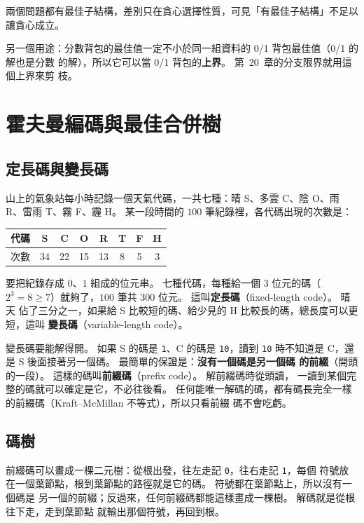兩個問題都有最佳子結構，差別只在貪心選擇性質，可見「有最佳子結構」不足以讓貪心成立。

另一個用途：分數背包的最佳值一定不小於同一組資料的 0/1 背包最佳值（0/1 的解也是分數
的解），所以它可以當 0/1 背包的\textbf{上界}。 第~20~章的分支限界就用這個上界來剪
枝。

\section{霍夫曼編碼與最佳合併樹}
\label{sec:gr-huffman}

\subsection{定長碼與變長碼}

山上的氣象站每小時記錄一個天氣代碼，一共七種：晴 S、多雲 C、陰 O、雨 R、雷雨 T、霧
F、霾 H。 某一段時間的 $100$ 筆紀錄裡，各代碼出現的次數是：

\begin{center}
\begin{tabular}{c*{7}{c}}
\toprule
代碼 & S & C & O & R & T & F & H \\
\midrule
次數 & 34 & 22 & 15 & 13 & 8 & 5 & 3 \\
\bottomrule
\end{tabular}
\end{center}

要把紀錄存成 $0$、$1$ 組成的位元串。 七種代碼，每種給一個 $3$ 位元的碼（$2^3 = 8 \ge
7$）就夠了，$100$ 筆共 $300$ 位元。 這叫\textbf{定長碼}（fixed-length code）。 晴天
佔了三分之一，如果給 S 比較短的碼、給少見的 H 比較長的碼，總長度可以更短，這叫
\textbf{變長碼}（variable-length code）。

變長碼要能解得開。 如果 S 的碼是 \texttt{1}、C 的碼是 \texttt{10}，讀到 \texttt{10}
時不知道是 C，還是 S 後面接著另一個碼。 最簡單的保證是：\textbf{沒有一個碼是另一個碼
的前綴}（開頭的一段）。 這樣的碼叫\textbf{前綴碼}（prefix code）。 解前綴碼時從頭讀，
一讀到某個完整的碼就可以確定是它，不必往後看。 任何能唯一解碼的碼，都有碼長完全一樣的前綴碼（Kraft--McMillan 不等式），所以只看前綴
碼不會吃虧。

\subsection{碼樹}

前綴碼可以畫成一棵二元樹：從根出發，往左走記 \texttt{0}，往右走記 \texttt{1}，每個
符號放在一個葉節點，根到葉節點的路徑就是它的碼。 符號都在葉節點上，所以沒有一個碼是
另一個的前綴；反過來，任何前綴碼都能這樣畫成一棵樹。 解碼就是從根往下走，走到葉節點
就輸出那個符號，再回到根。

